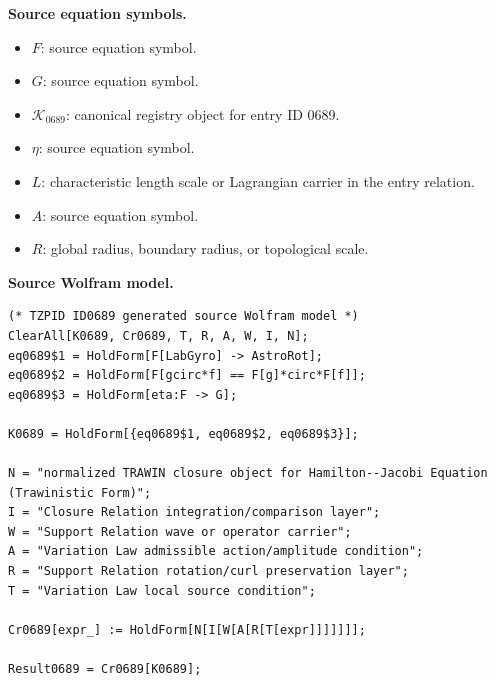 \begin{minipage}[t]{0.49\linewidth}
\begingroup
\small
\raggedright
\textbf{Source equation symbols.}\par
\begin{itemize}[leftmargin=1.35em,itemsep=1pt,topsep=1pt,parsep=0pt]
    \item $F$: source equation symbol.
    \item $G$: source equation symbol.
    \item $\mathcal{K}_{0689}$: canonical registry object for entry ID 0689.
    \item $\eta$: source equation symbol.
    \item $L$: characteristic length scale or Lagrangian carrier in the entry relation.
    \item $A$: source equation symbol.
    \item $R$: global radius, boundary radius, or topological scale.
\end{itemize}
\endgroup
\end{minipage}\hfill
\begin{minipage}[t]{0.47\linewidth}
\begingroup
\scriptsize
\raggedright
\textbf{Source Wolfram model.}\par
\begin{Verbatim}[fontsize=\tiny,breaklines=true,breakanywhere=true]
(* TZPID ID0689 generated source Wolfram model *)
ClearAll[K0689, Cr0689, T, R, A, W, I, N];
eq0689$1 = HoldForm[F[LabGyro] -> AstroRot];
eq0689$2 = HoldForm[F[gcirc*f] == F[g]*circ*F[f]];
eq0689$3 = HoldForm[eta:F -> G];

K0689 = HoldForm[{eq0689$1, eq0689$2, eq0689$3}];

N = "normalized TRAWIN closure object for Hamilton--Jacobi Equation (Trawinistic Form)";
I = "Closure Relation integration/comparison layer";
W = "Support Relation wave or operator carrier";
A = "Variation Law admissible action/amplitude condition";
R = "Support Relation rotation/curl preservation layer";
T = "Variation Law local source condition";

Cr0689[expr_] := HoldForm[N[I[W[A[R[T[expr]]]]]]];

Result0689 = Cr0689[K0689];
\end{Verbatim}
\endgroup
\end{minipage}


